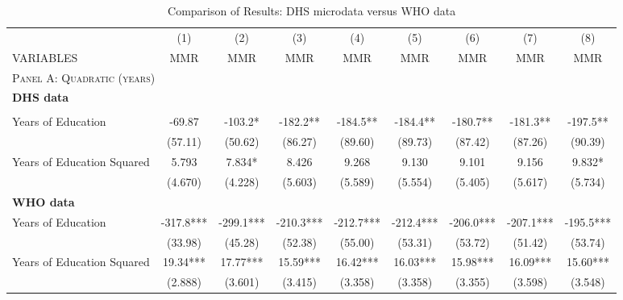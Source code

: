 \begin{landscape}\begin{table}[htpb!]\begin{center}\caption{Comparison of Results: DHS microdata versus WHO data}\label{MMRtab:MMRcomparsion}\begin{tabular}{lcccccccc}\toprule 
 &(1)&(2)&(3)&(4)&(5)&(6)&(7)&(8)\\VARIABLES&MMR&MMR&MMR&MMR&MMR&MMR&MMR&MMR\\\midrule
 \multicolumn{9}{l}{\textsc{Panel A: Quadratic (years)}}\\ \textbf{DHS data} &&&&&&&&\\ 
\begin{footnotesize}\end{footnotesize}&\begin{footnotesize}\end{footnotesize}&\begin{footnotesize}\end{footnotesize}&\begin{footnotesize}\end{footnotesize}&\begin{footnotesize}\end{footnotesize}&\begin{footnotesize}\end{footnotesize}&\begin{footnotesize}\end{footnotesize}&\begin{footnotesize}\end{footnotesize}\\Years of Education&-69.87&-103.2*&-182.2**&-184.5**&-184.4**&-180.7**&-181.3**&-197.5**\\
&(57.11)&(50.62)&(86.27)&(89.60)&(89.73)&(87.42)&(87.26)&(90.39)\\
Years of Education Squared&5.793&7.834*&8.426&9.268&9.130&9.101&9.156&9.832*\\
&(4.670)&(4.228)&(5.603)&(5.589)&(5.554)&(5.405)&(5.617)&(5.734)\\
\textbf{WHO data}&&&&&&&&\\ 
Years of Education&-317.8***&-299.1***&-210.3***&-212.7***&-212.4***&-206.0***&-207.1***&-195.5***\\
&(33.98)&(45.28)&(52.38)&(55.00)&(53.31)&(53.72)&(51.42)&(53.74)\\
Years of Education Squared&19.34***&17.77***&15.59***&16.42***&16.03***&15.98***&16.09***&15.60***\\
&(2.888)&(3.601)&(3.415)&(3.358)&(3.358)&(3.355)&(3.598)&(3.548)\\

\end{tabular}
\end{center}
\end{table}
\end{landscape}

